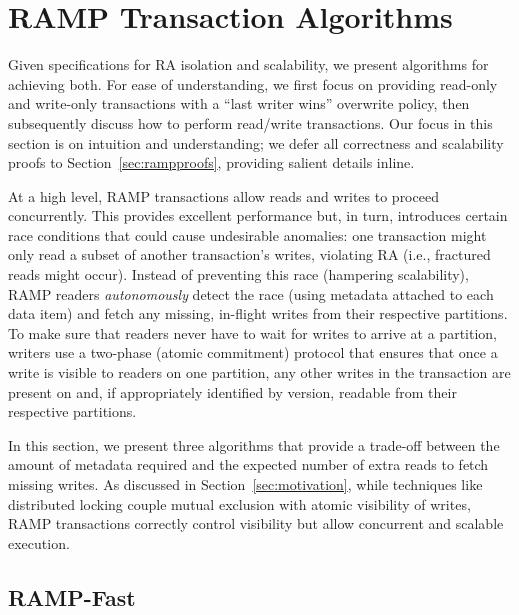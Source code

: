 
\section{RAMP Transaction Algorithms}
\label{sec:ramp-algorithm}

Given specifications for RA isolation and scalability, we present
algorithms for achieving both. For ease of understanding, we first
focus on providing read-only and write-only transactions with a ``last
writer wins'' overwrite policy, then subsequently discuss how to
perform read/write transactions. Our focus in this section is on
intuition and understanding; we defer all correctness and scalability
proofs to Section~\ref{sec:rampproofs}, providing salient details inline.

At a high level, RAMP transactions allow reads and writes to proceed
concurrently. This provides excellent performance but, in turn,
introduces certain race conditions that could cause undesirable
anomalies: one transaction might only read a subset of another
transaction's writes, violating RA (i.e., fractured reads might
occur). Instead of preventing this race (hampering scalability), RAMP
readers \textit{autonomously} detect the race (using metadata attached
to each data item) and fetch any missing, in-flight writes from their
respective partitions. To make sure that readers never have to wait
for writes to arrive at a partition, writers use a two-phase (atomic
commitment) protocol that ensures that once a write is visible to
readers on one partition, any other writes in the transaction are
present on and, if appropriately identified by version, readable from
their respective partitions.

In this section, we present three algorithms that provide a trade-off
between the amount of metadata required and the expected number of
extra reads to fetch missing writes. As discussed in
Section~\ref{sec:motivation}, while techniques like distributed
locking couple mutual exclusion with atomic visibility of writes, RAMP
transactions correctly control visibility but allow concurrent and
scalable execution.

\subsection{RAMP-Fast}
\label{sec:rapl}


